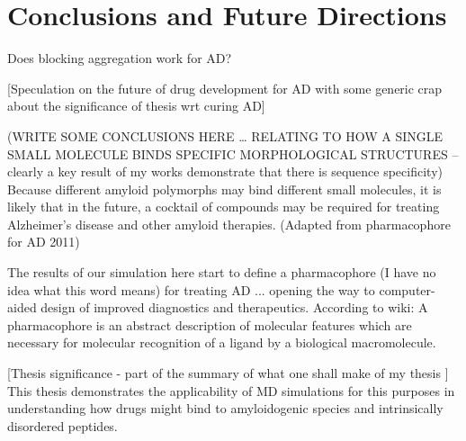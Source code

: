 \chapter{Conclusions and Future Directions}



Does blocking aggregation work for AD?

[Speculation on the future of drug development for AD with some generic crap about the significance of thesis wrt curing AD] 


(WRITE SOME CONCLUSIONS HERE … RELATING TO HOW A SINGLE SMALL MOLECULE BINDS SPECIFIC MORPHOLOGICAL STRUCTURES -- clearly a key result of my works demonstrate that there is sequence specificity) Because different amyloid polymorphs may bind different small molecules, it is likely that in the future, a cocktail of compounds may be required for treating Alzheimer’s disease and other amyloid therapies. (Adapted from pharmacophore for AD 2011)

The results of our simulation here start to define a pharmacophore (I have no idea what this word means) for treating AD ... opening the way to computer-aided design of improved diagnostics and therapeutics. 
According to wiki: A pharmacophore is an abstract description of molecular features which are necessary for molecular recognition of a ligand by a biological macromolecule.

[Thesis significance - part of the summary of what one shall make of my thesis ] This thesis demonstrates the applicability of MD simulations for this purposes in understanding how drugs might bind to amyloidogenic species and intrinsically disordered peptides. 


